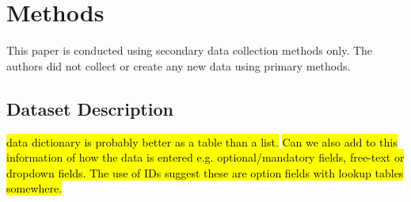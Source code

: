 \documentclass[10pt]{article}\usepackage[]{graphicx}\usepackage[]{color}
\begin{document}
\section {Methods}\label{methods}

This paper is conducted using secondary data collection methods only. The authors did not collect or create any new data using primary methods.


\subsection{Dataset Description}\label{dataset}

\hl{data dictionary is probably better as a table than a list.}
\hl{Can we also add to this information of how the data is entered e.g. optional/mandatory fields, free-text or dropdown fields. The use of IDs suggest these are option fields with lookup tables somewhere.}
\end{document}
